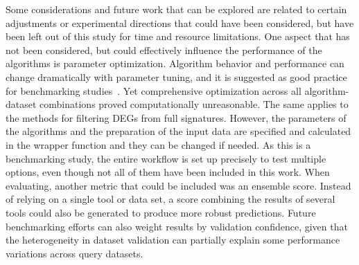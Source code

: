 Some considerations and future work that can be explored are related to certain adjustments or experimental directions that could have been considered, but have been left out of this study for time and resource limitations. 
One aspect that has not been considered, but could effectively influence the performance of the algorithms is parameter optimization. 
Algorithm behavior and performance can change dramatically with parameter tuning, and it is suggested as good practice for benchmarking studies~\cite{RN108}. 
Yet comprehensive optimization across all algorithm-dataset combinations proved computationally unreasonable. 
The same applies to the methods for filtering \gls{DEGs} from full signatures. 
However, the parameters of the algorithms and the preparation of the input data are specified and calculated in the wrapper function and they can be changed if needed. 
As this is a benchmarking study, the entire workflow is set up precisely to test multiple options, even though not all of them have been included in this work. 
When evaluating, another metric that could be included was an ensemble score. 
Instead of relying on a single tool or data set, a score combining the results of several tools could also be generated to produce more robust predictions. 
Future benchmarking efforts can also weight results by validation confidence, given that the heterogeneity in dataset validation can partially explain some performance variations across query datasets.

